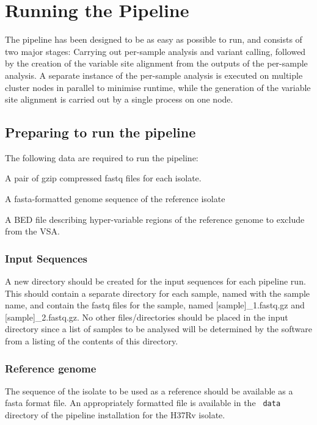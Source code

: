 \documentclass[a4paper,10pt,twoside]{article}
\newenvironment{tight_enumerate}{
\begin{enumerate}
  \setlength{\itemsep}{0pt}
  \setlength{\parskip}{0pt}
}{\end{enumerate}}
\begin{document}
\section {Running the Pipeline}

The pipeline has been designed to be as easy as possible to run, and consists
of two major stages: Carrying out per-sample analysis and variant calling,
followed by the creation of the variable site alignment from the outputs of the
per-sample analysis. A separate instance of the per-sample analysis is executed
on multiple cluster nodes in parallel to minimise runtime, while the generation
of the variable site alignment is carried out by a single process on one node.

\subsection {Preparing to run the pipeline}

The following data are required to run the pipeline:

\begin{tight_enumerate}
\item A pair of gzip compressed fastq files for each isolate. 
\item A fasta-formatted genome sequence of the reference isolate
\item A BED file describing hyper-variable regions of the reference genome to exclude from the VSA.
\end{tight_enumerate}

\subsubsection {Input Sequences}

A new directory should be created for the input sequences for each pipeline
run. This should contain a separate directory for each sample, named with the
sample name, and contain the fastq files for the sample, named
[sample]\_1.fastq.gz and [sample]\_2.fastq.gz. No other files/directories
should be placed in the input directory since a list of samples to be analysed
will be determined by the software from a listing of the contents of this
directory.

\subsubsection {Reference genome}

The sequence of the isolate to be used as a reference should be available as a
fasta format file. An appropriately formatted file is available in the {\tt
data} directory of the pipeline installation for the H37Rv isolate. 
\end{document}

